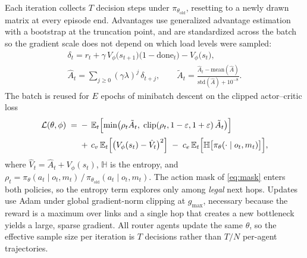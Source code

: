 Each iteration collects $T$ decision steps under $\pi_{\theta_{\mathrm{old}}}$, resetting to a
newly drawn matrix at every episode end. Advantages use generalized advantage estimation with a
bootstrap at the truncation point, and are standardized across the batch so the gradient scale
does not depend on which load levels were sampled:
\begin{equation}\label{eq:gae}
\begin{gathered}
\delta_t = r_t + \gamma\,V_\phi\bigl(s_{t+1}\bigr)\bigl(1-\mathrm{done}_t\bigr) - V_\phi\bigl(s_t\bigr), \\[3pt]
\hat{A}_t = \sum_{j\ge 0} (\gamma\lambda)^{j}\,\delta_{t+j},
\qquad
\tilde{A}_t = \frac{\hat{A}_t - \mathrm{mean}(\hat{A})}{\mathrm{std}(\hat{A}) + 10^{-8}} .
\end{gathered}
\end{equation}
The batch is reused for $E$ epochs of minibatch descent on the clipped actor--critic loss
\begin{equation}\label{eq:loss}
\begin{aligned}
\mathcal{L}(\theta,\phi) \;=\;
&-\,\mathbb{E}_{t}\Bigl[\min\bigl(\rho_t\tilde{A}_t,\;
\mathrm{clip}(\rho_t,1-\varepsilon,1+\varepsilon)\,\tilde{A}_t\bigr)\Bigr] \\[2pt]
&+\, c_v\,\mathbb{E}_{t}\Bigl[\bigl(V_\phi(s_t)-\hat{V}_t\bigr)^{2}\Bigr]
\;-\; c_e\,\mathbb{E}_{t}\Bigl[\mathbb{H}\bigl[\pi_\theta(\cdot\mid o_t,m_t)\bigr]\Bigr],
\end{aligned}
\end{equation}
where $\hat{V}_t = \hat{A}_t + V_\phi(s_t)$, $\mathbb{H}$ is the entropy, and
$\rho_t = \pi_\theta(a_t\mid o_t,m_t) \,/\,
\pi_{\theta_{\mathrm{old}}}(a_t\mid o_t,m_t)$. The action mask of \eqref{eq:mask} enters both
policies, so the entropy term explores only among \emph{legal} next hops. Updates use Adam under
global gradient-norm clipping at $g_{\max}$, necessary because the reward is a maximum over links
and a single hop that creates a new bottleneck yields a large, sparse gradient. All router agents
update the same $\theta$, so the effective sample size per iteration is $T$ decisions rather than
$T/N$ per-agent trajectories.


